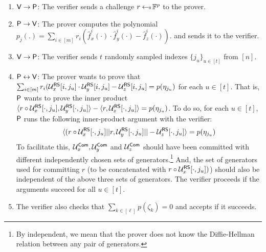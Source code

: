 \begin{enumerate}[{\rm 1.}]
\item $\mathsf{V}\rightarrow\mathsf{P}$: The verifier sends a challenge $r\hskip2.3pt{\gets\!\!\mbox{\tiny${\$}$\normalsize}}\,
\mathbb{F}^p$ to the prover.
\item $\mathsf{P}\rightarrow\mathsf{V}$: The prover computes the polynomial $p_j(.)=\sum_{i\in [m]}
r_i(\hat{f}^i_x(\cdot) \cdot \hat{f}^i_y(\cdot) - \hat{f}^i_z(\cdot))$.
and sends it to the verifier.

\item $\mathsf{V}\rightarrow\mathsf{P}$: The verifier sends $t$ randomly sampled indexes $\{j_u\}_{u\in [t]}$ from $[n]$. 

\item $\mathsf{P}\leftrightarrow\mathsf{V}$: The prover wants to prove that 
$\sum_{i\in [m]} r_i(\mathcal{U}^{\mathsf{RS}}_x[i,j_u] \cdot \mathcal{U}^{\mathsf{RS}}_y[i,j_u]-\mathcal{U}^{\mathsf{RS}}_z[i,j_u] = p(\eta_{j_u})$ for each $u \in [t]$.
That is, $\mathsf{P}$ wants to prove the inner product $\langle r \circ \mathcal{U}^{\mathsf{RS}}_x[\cdot,j_u],\mathcal{U}^{\mathsf{RS}}_y[\cdot,j_u]\rangle - \langle r,\mathcal{U}^{\mathsf{RS}}_z[\cdot,j_u]\rangle = p(\eta_{j_u})$.
To do so, for each $u \in [t]$, $\mathsf{P}$ runs the following inner-product argument with the verifier: 
\[
\langle (r \circ \mathcal{U}^{\mathsf{RS}}_x[\cdot,j_u] || r,\mathcal{U}^{\mathsf{RS}}_y[\cdot,j_u] || -\mathcal{U}^{\mathsf{RS}}_z[\cdot,j_u] \rangle = p(\eta_{j_u})
\]
To facilitate this, $\mathcal{U}^{\mathsf{Com}}_x,\mathcal{U}^{\mathsf{Com}}_y$ and $\mathcal{U}^{\mathsf{Com}}_z$ should have been committed with different independently chosen sets of generators.\footnote{By independent, we mean that the prover does not know the Diffie-Hellman relation between any pair of generators.} And, the set of generators used for committing $r$ (to be concatenated with $r \circ \mathcal{U}^{\mathsf{RS}}_x[\cdot,j_u])$) should also be independent of the above three sets of generators.
The verifier proceeds if the arguments succeed for all $u \in [t]$.

\item The verifier also checks that $\sum_{k\in [\ell]}p(\zeta_k)=0$ and accepts if it succeeds.
\end{enumerate}






